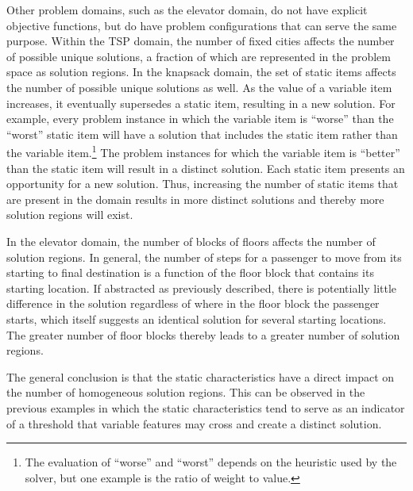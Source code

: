 Other problem domains, such as the elevator domain, do not have explicit objective functions, but do have problem configurations that can serve the same purpose.  Within the TSP domain, the number of fixed cities affects the number of possible unique solutions, a fraction of which are represented in the problem space as solution regions.  In the knapsack domain, the set of static items affects the number of possible unique solutions as well.  As the value of a variable item increases, it eventually supersedes a  static item, resulting in a new solution.  For example, every problem instance in which the variable item is ``worse'' than the ``worst'' static item will have a solution that includes the static item rather than the variable item.\footnote{The evaluation of ``worse'' and ``worst'' depends on the heuristic used by the solver, but one example is the ratio of weight to value.}  The problem instances for which the variable item is ``better'' than the static item will result in a distinct solution.  Each static item presents an opportunity for a new solution. Thus, increasing the number of static items that are present in the domain results in  more distinct solutions and thereby more solution regions will exist.  

In the elevator domain, the number of blocks of floors affects the number of solution regions.  In general, the number of steps for a passenger to move from its starting to final destination is a function of the floor block that contains its starting location.  If abstracted as previously described, there is potentially little difference in the solution regardless of where in the floor block the passenger starts, which itself suggests an identical solution for several starting locations.  The greater number of floor blocks thereby leads to a greater number of solution regions.

The general conclusion is that the static characteristics have a direct impact on the number of homogeneous solution regions.  This can be observed in the previous examples in which the static characteristics tend to serve as an indicator of a threshold that variable features may cross and create a distinct solution.

